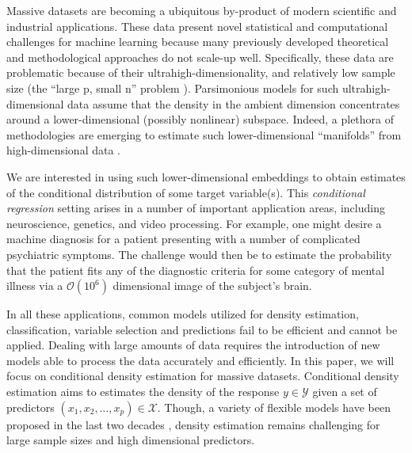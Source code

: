 \documentclass{article}
\begin{document}
Massive datasets are becoming a ubiquitous by-product of modern scientific and industrial applications. These data present novel statistical and computational challenges for machine learning because many previously developed theoretical and methodological approaches do not scale-up well.  Specifically, these data are problematic because of their ultrahigh-dimensionality, and relatively low sample size (the ``large p, small n'' problem \cite{West}).
Parsimonious models for such ultrahigh-dimensional data assume that the density in the ambient dimension concentrates around a lower-dimensional (possibly nonlinear) subspace.  Indeed, a plethora of methodologies are emerging to estimate such lower-dimensional ``manifolds'' from high-dimensional data \cite{Manifold, Maggioni}.  

We are interested in using such lower-dimensional embeddings to obtain estimates of the conditional distribution of some target variable(s).  This \emph{conditional regression} setting arises in a number of important application areas, including neuroscience, genetics, and video processing.  For example, one might desire a machine diagnosis for a patient presenting with a number of complicated psychiatric symptoms.   The challenge would then be to estimate the probability that the patient fits any of the diagnostic criteria for some category of mental illness via a $\mathcal{O}(10^6)$ dimensional image of the subject's brain. 


In all these applications, common models utilized for density estimation, classification, variable selection and predictions fail to be efficient and cannot be applied. 
Dealing with large amounts of data requires the introduction of new models able to process the data accurately and efficiently. 
In this paper, we will focus on conditional density estimation for massive datasets. Conditional density estimation aims to estimates the density of the response $y \in \mathcal{Y}$ given a set of predictors $(x_1, x_2, \ldots, x_p)\in \mathcal{X}$. Though, a variety of flexible models have been proposed in the last two decades \cite{DDP, DunsonPark}, density estimation remains challenging for large sample sizes and high dimensional predictors. 
\end{document}
